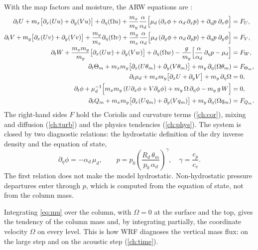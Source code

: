 With the map factors and moisture, the ARW equations are \citep{skamarock2019}:
\begin{align}
  \partial_t U + m_x\bigl[\partial_x(Uu) + \partial_y(Vu)\bigr] + \partial_\eta(\Omega u)
    + \frac{m_x}{m_y}\frac{\alpha}{\alpha_d}\Bigl[\mu_d\,(\partial_x\phi + \alpha_d\,\partial_x p)
    + \partial_\eta p\;\partial_x\phi\Bigr] &= F_U , \label{eq:U}\\
  \partial_t V + m_y\bigl[\partial_x(Uv) + \partial_y(Vv)\bigr] + \frac{m_y}{m_x}\partial_\eta(\Omega v)
    + \frac{m_y}{m_x}\frac{\alpha}{\alpha_d}\Bigl[\mu_d\,(\partial_y\phi + \alpha_d\,\partial_y p)
    + \partial_\eta p\;\partial_y\phi\Bigr] &= F_V , \label{eq:V}\\
  \partial_t W + \frac{m_x m_y}{m_y}\bigl[\partial_x(Uw) + \partial_y(Vw)\bigr] + \partial_\eta(\Omega w)
    - \frac{g}{m_y}\Bigl[\frac{\alpha}{\alpha_d}\,\partial_\eta p - \mu_d\Bigr] &= F_W , \label{eq:W}\\
  \partial_t \Theta_m + m_x m_y\bigl[\partial_x(U\theta_m) + \partial_y(V\theta_m)\bigr]
    + m_y\,\partial_\eta(\Omega\theta_m) &= F_{\Theta_m} , \label{eq:T}\\
  \partial_t \mu_d + m_x m_y\bigl[\partial_x U + \partial_y V\bigr] + m_y\,\partial_\eta\Omega &= 0 , \label{eq:mu}\\
  \partial_t \phi + \mu_d^{-1}\Bigl[m_x m_y\,(U\partial_x\phi + V\partial_y\phi) + m_y\,\Omega\,\partial_\eta\phi
    - m_y\, g\, W\Bigr] &= 0 , \label{eq:phi}\\
  \partial_t Q_m + m_x m_y\bigl[\partial_x(Uq_m) + \partial_y(Vq_m)\bigr] + m_y\,\partial_\eta(\Omega q_m)
    &= F_{Q_m} . \label{eq:Q}
\end{align}
The right-hand sides $F$ hold the Coriolis and curvature terms (\cref{ch:cor}), mixing and diffusion
(\cref{ch:turb}) and the physics tendencies (\cref{ch:phys}). The system is closed by two diagnostic relations:
the hydrostatic definition of the dry inverse density and the equation of state,
\begin{equation}
  \partial_\eta\phi = -\alpha_d\,\mu_d , \qquad
  p = p_0\left(\frac{R_d\,\theta_m}{p_0\,\alpha_d}\right)^{\gamma}, \quad \gamma = \frac{c_p}{c_v}.
  \label{eq:hydro-diag}
\end{equation}
The first relation does not make the model hydrostatic. Non-hydrostatic pressure departures enter through $p$, which
is computed from the equation of state, not from the column mass.

Integrating \cref{eq:mu} over the column, with $\Omega = 0$ at the surface and the top, gives the tendency of the
column mass and, by integrating partially, the coordinate velocity $\Omega$ on every level. This is how WRF diagnoses
the vertical mass flux:  on the large step and
 on the acoustic step (\cref{ch:time}).

